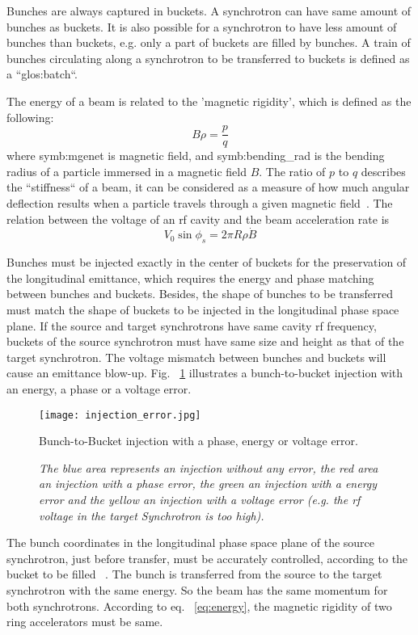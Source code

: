 Bunches are always captured in buckets. A synchrotron can have same amount of bunches as buckets. It is also possible for a synchrotron to have less amount of bunches than buckets, e.g. only a part of buckets are filled by bunches. A train of bunches circulating along a synchrotron to be transferred to buckets is defined as a ``\gls{glos:batch}``.

The energy of a beam is related to the 'magnetic rigidity', which is defined as the following:
\begin{equation}
	\label{eq:energy}
	B\rho =\frac{p}{q}
\end{equation}
where \gls{symb:mgenet} is magnetic field, and \gls{symb:bending_rad} is the bending radius of a particle immersed in a magnetic field $B$. The ratio of $p$ to $q$ describes the ``stiffness`` of a beam, it can be considered as a measure of how much angular deflection results when a particle travels through a given magnetic field~\cite{barletta_lecture_nodate}. The relation between the voltage of an rf cavity and the beam acceleration rate is
\begin{equation}
	\label{eq:rf_acceleration}
	V_0\sin\phi_s=2\pi R\rho\dot{B}
\end{equation}

Bunches must be injected exactly in the center of buckets for the preservation of the longitudinal emittance, which requires the energy and phase matching between bunches and buckets. Besides, the shape of bunches to be transferred must match the shape of buckets to be injected in the longitudinal phase space plane. If the source and target synchrotrons have same cavity rf frequency, buckets of the source synchrotron must have same size and height as that of the target synchrotron. The voltage mismatch between bunches and buckets will cause an emittance blow-up. Fig. ~\ref{injection_error} illustrates a bunch-to-bucket injection with an energy, a phase or a voltage error. 
\begin{figure}[!htb]
   \centering   
   \texttt{[image: injection\_error.jpg]}
   \caption{Bunch-to-Bucket injection with a phase, energy or voltage error.}
	\caption*{\textsl{\small{The blue area represents an injection without any error, the red area an injection with a phase error, the green an injection with a energy error and the yellow an injection with a voltage error (e.g. the rf voltage in the target Synchrotron is too high).}}}
   \label{injection_error}
\end{figure} 

The bunch coordinates in the longitudinal phase space plane of the source synchrotron, just before transfer, must be accurately controlled, according to the bucket to be filled ~\cite{garoby_cern-ps-rf-note-84-6_1984}. The bunch is transferred from the source to the target synchrotron with the same energy. So the beam has the same momentum for both synchrotrons. According to eq. ~\ref{eq:energy}, the magnetic rigidity of two ring accelerators must be same.


